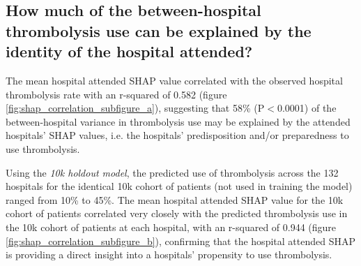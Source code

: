 \subsection{How much of the between-hospital thrombolysis use can be explained by the identity of the hospital attended?}

The mean hospital attended SHAP value correlated with the observed hospital thrombolysis rate with an r-squared of 0.582 (figure \ref{fig:shap_correlation_subfigure_a}), suggesting that 58\% (P$<$0.0001) of the between-hospital variance in thrombolysis use may be explained by the attended hospitals' SHAP values, i.e. the hospitals' predisposition and/or preparedness to use thrombolysis. %

Using the \emph{10k holdout model}, the predicted use of thrombolysis across the 132 hospitals for the identical 10k cohort of patients (not used in training the model) ranged from 10\% to 45\%. The mean hospital attended SHAP value for the 10k cohort of patients correlated very closely with the predicted thrombolysis use in the 10k cohort of patients at each hospital, with an r-squared of 0.944 (figure \ref{fig:shap_correlation_subfigure_b}), confirming that the hospital attended SHAP is providing a direct insight into a hospitals' propensity to use thrombolysis.

